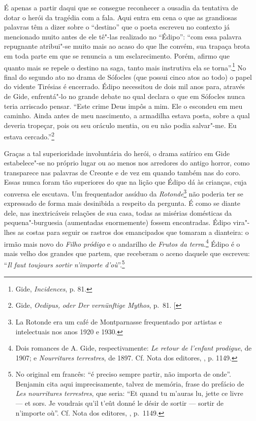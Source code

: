 É apenas a partir daqui que se consegue reconhecer a ousadia da
tentativa de dotar o herói da tragédia com a fala. Aqui entra em cena o
que as grandiosas palavras têm a dizer sobre o ``destino'' que o poeta
escreveu no contexto já mencionado muito antes de ele tê"-las realizado
no ``Édipo'': ``com essa palavra repugnante atribui"-se muito mais ao
acaso do que lhe convém, sua trapaça brota em toda parte em que se
renuncia a um esclarecimento. Porém, afirmo que quanto mais se repele o
destino na saga, tanto mais instrutiva ela se torna''.\footnote{Gide, \emph{Incidences}, p. 81. \versal{[N.~T.]}} No final do segundo ato no drama de %
Sófocles (que possui cinco atos ao todo) o papel do vidente Tirésias é
encerrado. Édipo necessitou de dois mil anos para, através de Gide,
enfrentá"-lo no grande debate no qual declara o que em Sófocles nunca
teria arriscado pensar. ``Este crime Deus impôs a mim. Ele o escondeu em
meu caminho. Ainda antes de meu nascimento, a armadilha estava posta,
sobre a qual deveria tropeçar, pois ou seu oráculo mentia, ou eu não
podia salvar"-me. Eu estava cercado.''\footnote{Gide, \emph{Oedipus, oder Der vernünftige Mythos}, p.~81. {[}\versal{N.~T.}{]}}

Graças a tal superioridade involuntária do herói, o drama satírico em
Gide estabelece"-se no próprio lugar ou ao menos nos arredores do antigo
horror, como transparece nas palavras de Creonte e de vez em quando
também nas do coro. Essas nunca foram tão superiores do que na lição que
Édipo dá às crianças, cuja conversa ele escutava. Um frequentador
assíduo da \emph{Rotonde}\footnote{La Rotonde era um café de Montparnasse
  frequentado por artistas e intelectuais nos anos 1920 e 1930. \versal{[N.~O.]}} não
poderia ter se expressado de forma mais desinibida a respeito da
pergunta. É como se diante dele, nas inextricáveis relações de sua
casa, todas as misérias domésticas da pequena"-burguesia (aumentadas
enormemente) fossem encontradas. Édipo vira"-lhes as costas para seguir
os rastros dos emancipados que tomaram a dianteira: o irmão mais novo do
\emph{Filho pródigo} e o andarilho de \emph{Frutos da terra}.\footnote{Dois romances de A. Gide, respectivamente: \emph{Le retour de l'enfant
  prodigue}, de 1907; e \emph{Nourritures terrestres}, de 1897. Cf. Nota
  dos editores, , p. 1149. \versal{[N.~O.]}} Édipo é o
mais velho dos grandes que partem, que receberam o aceno daquele que
escreveu: ``\emph{Il faut toujours sortir n'importe d'où}''.\footnote{No original em francês: ``é preciso sempre partir, não importa de onde''.
  Benjamin cita aqui imprecisamente, talvez de memória, frase do
  prefácio de \emph{Les nourritures terrestres}, que seria: ``Et quand
  tu m'auras lu, jette ce livre --- et sors. Je voudrais qu'il t'eût
  donné le désir de sortir --- sortir de n'importe où''. Cf. Nota dos
  editores, , p.~1149. \versal{[N.~T.]}}
